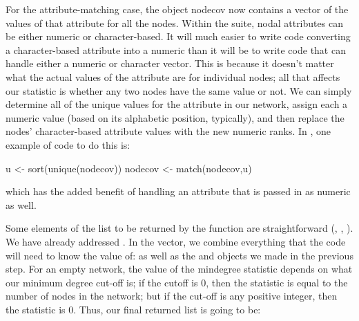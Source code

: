 \documentclass[nojss]{jss}
\begin{document}
\begin{CodeChunk}
\end{CodeChunk}

For the attribute-matching case, the object nodecov now contains a vector of the values of that attribute for all the nodes. Within the  suite, nodal attributes can be either numeric or character-based. It will much easier to write  code converting a character-based attribute into a numeric than it will be to write  code that can handle either a numeric or character vector.  This is because it doesn't matter what the actual values of the attribute are for individual nodes; all that affects our statistic is whether any two nodes have the same value or not.  We can simply determine all of the unique values for the attribute in our network, assign each a numeric value (based on its alphabetic position, typically), and then replace the nodes' character-based attribute values with the new numeric ranks.  In , one example of code to do this is:

\begin{CodeChunk}
\begin{CodeInput}
  u <- sort(unique(nodecov))
  nodecov <- match(nodecov,u)
\end{CodeInput}
\end{CodeChunk}

which has the added benefit of handling an attribute that is passed in as numeric as well.

Some elements of the list to be returned by the function are straightforward (, , ).  We have already addressed . In the  vector, we combine everything that the  code will need to know the value of:  as well as the  and  objects we made in the previous step. For an empty network, the value of the mindegree statistic depends on what our minimum degree cut-off is; if the cutoff is 0, then the statistic is equal to the number of nodes in the network; but if the cut-off is any positive integer, then the statistic is 0. Thus, our final returned list is going to be:
\end{document}
